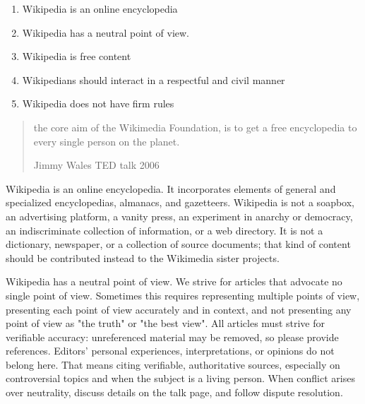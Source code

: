 \documentclass[a4paper,landscape,headrule,footrule,xetex]{foils}
\begin{document}
\begin{enumerate}
\item Wikipedia is an online encyclopedia
\item Wikipedia has a neutral point of view.
\item Wikipedia is free content
\item Wikipedians should interact in a respectful and civil manner
\item Wikipedia does not have firm rules
\end{enumerate}
\begin{quote}
  the core aim of the Wikimedia Foundation, is to get a free
  encyclopedia to every single person on the planet.
\begin{flushright}
  Jimmy Wales TED talk 2006
\end{flushright}
\end{quote}


\begin{large}
  Wikipedia is an online encyclopedia. It incorporates elements of
  general and specialized encyclopedias, almanacs, and
  gazetteers. Wikipedia is not a soapbox, an advertising platform, a
  vanity press, an experiment in anarchy or democracy, an
  indiscriminate collection of information, or a web directory. It is
  not a dictionary, newspaper, or a collection of source documents;
  that kind of content should be contributed instead to the Wikimedia
  sister projects.
\end{large}

\begin{large}
  Wikipedia has a neutral point of view. We strive for articles that
  advocate no single point of view. Sometimes this requires
  representing multiple points of view, presenting each point of view
  accurately and in context, and not presenting any point of view as
  "the truth" or "the best view". All articles must strive for
  verifiable accuracy: unreferenced material may be removed, so please
  provide references. Editors' personal experiences, interpretations,
  or opinions do not belong here. That means citing verifiable,
  authoritative sources, especially on controversial topics and when
  the subject is a living person. When conflict arises over
  neutrality, discuss details on the talk page, and follow dispute
  resolution.
\end{large}
\end{document}
